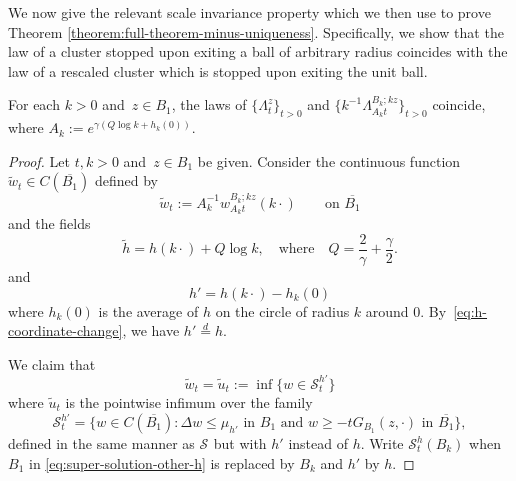 \documentclass[12pt]{amsart}
\numberwithin{equation}{section}
\newcommand{\mclS}[2]{\hyperref[eq:super-solutions]{\mathcal{S}^{#1}_{#2}}}
\newcommand{\lss}[2]{\hyperref[eq:least-super-solution]{w^{#1}_{#2}}}
\newcommand{\cluster}[2]{\hyperref[eq:non-co-set]{\mathit{\Lambda}^{#1}_{#2}}}
\begin{document}
	
	We now give the relevant scale invariance property which we then use to prove Theorem \ref{theorem:full-theorem-minus-uniqueness}. 
	Specifically, we show that the law of a cluster stopped upon exiting a ball of arbitrary radius coincides with the law of a rescaled cluster which is stopped upon exiting the unit ball. 
	\begin{lemma} \label{lemma:scale-invariance-flow}
		For each $k > 0$ and~$z \in B_1$, the laws of $\{ \cluster{z}{t}\}_{t > 0}$ and $\{ k^{-1} \cluster{B_{k}; k z}{A_k t}\}_{t > 0}$ coincide, where  
		$A_k := e^{\gamma (Q \log k + h_k(0))}$.
	\end{lemma}
	
	\begin{proof}
		Let $t, k > 0$ and~$z \in B_1$ be given.
		Consider the continuous function $\tilde{w}_t \in C(\overline{B_1})$ defined by 
		\begin{equation} \label{eq:definition-of-tildewt}
		\tilde{w}_{t} := A_k^{-1} \lss{B_{k}; k z}{A_k t}(k\cdot) \qquad \mbox{on $\overline{B_1}$}
		\end{equation}
		and the fields
		\begin{equation}
		\tilde{h} = h(k \cdot) + Q \log k, \quad \mbox{where} \quad Q = \frac{2}{\gamma} + \frac{\gamma}{2}.
		\end{equation}
		and
		\begin{equation}
		h' = h(k \cdot) - h_k(0)
		\end{equation}
		where $h_k(0)$ is the average of $h$ on the circle of radius $k$ around 0. By~\eqref{eq:h-coordinate-change}, we have $h' \overset{d}{=} h$. 
		
		We claim that
		\begin{equation}
		\tilde{w}_{t} = \tilde{u}_t := \inf\{ w \in \mathcal{S}^{h'}_t\}
		\end{equation}
		where $\tilde{u}_t$ is the pointwise infimum over the family
		\begin{equation} \label{eq:super-solution-other-h}
		\mathcal{S}^{h'}_t  = \{ w \in C(\overline{B_1}) :  \Delta w \leq \mu_{h'} \mbox{ in $B_1$}  \mbox{ and }  w \geq  -t G_{B_1}(z, \cdot) \mbox{ in $\overline{B_1}$}\},
		\end{equation}
		defined in the same manner as $\mclS{}{}$ but with $h'$ instead of $h$. Write $\mathcal{S}^h_{t}(B_{k})$ when $B_1$ in \eqref{eq:super-solution-other-h} is replaced by $B_{k}$ and $h'$ by $h$. 
		

\end{proof}
\end{document}
